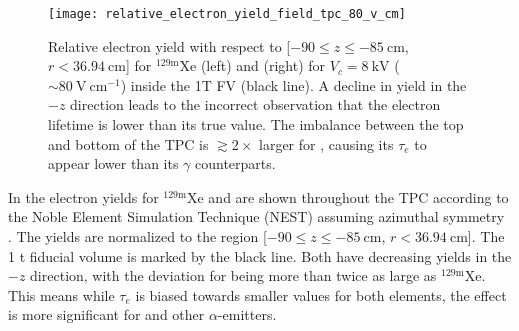 \begin{figure}
\centering
\texttt{[image: relative\_electron\_yield\_field\_tpc\_80\_v\_cm]}
\caption[Relative electron yield with respect to $\lbrack -90 \leq z \leq -85\ \mathrm{cm}$, $r < 36.94\ \mathrm{cm} \rbrack$ for
$\mathrm{^{129m}Xe}$ and  for $V_c = 8\ \mathrm{kV}$ (${\sim}80\ \mathrm{V\ cm^{-1}}$) inside the 1T FV.]{Relative electron
yield with respect to [$-90 \leq z \leq -85\ \mathrm{cm}$, $r < 36.94\ \mathrm{cm}$] for
$\mathrm{^{129m}Xe}$ (left) and  (right) for $V_c = 8\ \mathrm{kV}$ (${\sim}80\ \mathrm{V\ cm^{-1}}$) inside the 1T FV (black
line).  A decline in yield in the $-z$ direction leads to the incorrect observation that the electron lifetime is lower than its
true value.  The imbalance between the top
and bottom of the TPC is $\gtrsim 2\times$ larger for , causing its $\tau_e$ to appear lower than its $\gamma$ counterparts.}
\label{fig:electron_lifetimes_rn222_vs_kr83m_field_tpc}
\end{figure}

In  the electron yields for $\mathrm{^{129m}Xe}$ and 
are shown throughout the TPC according to the Noble Element Simulation Technique (NEST) assuming azimuthal symmetry .  The
yields are normalized to the region [$-90 \leq z \leq -85\ \mathrm{cm}$,
$r < 36.94\ \mathrm{cm}$].  The 1 t fiducial volume is marked by the black line.  Both have decreasing yields in the $-z$ direction,
with the deviation for  being more than twice as large as $\mathrm{^{129m}Xe}$.  This means while $\tau_e$ is biased towards
smaller values for both elements, the effect is more significant for  and other $\alpha$-emitters.

